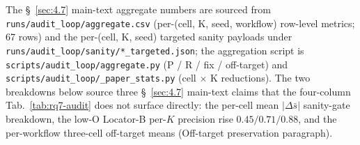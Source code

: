 The \S~\ref{sec:4.7} main-text aggregate numbers are sourced from \texttt{runs/\allowbreak{}audit\_\allowbreak{}loop/\allowbreak{}aggregate.csv} (per-(cell, K, seed, workflow) row-level metrics; 67 rows) and the per-(cell, K, seed) targeted sanity payloads under \texttt{runs/\allowbreak{}audit\_\allowbreak{}loop/\allowbreak{}sanity/\allowbreak{}*\_\allowbreak{}targeted.json}; the aggregation script is \texttt{scripts/\allowbreak{}audit\_\allowbreak{}loop/\allowbreak{}aggregate.py} (P / R / fix / off-target) and \texttt{scripts/\allowbreak{}audit\_\allowbreak{}loop/\allowbreak{}\_\allowbreak{}paper\_\allowbreak{}stats.py} (cell $\times$ K reductions). The two breakdowns below source three \S~\ref{sec:4.7} main-text claims that the four-column Tab.~\ref{tab:rq7-audit} does not surface directly: the per-cell mean $|\Delta\bar{s}|$ sanity-gate breakdown, the low-O Locator-B per-$K$ precision rise $0.45 / 0.71 / 0.88$, and the per-workflow three-cell off-target means (Off-target preservation paragraph).

\begin{table}[t]
\centering
{}
\caption{\S~\ref{sec:4.7} sanity-gate breakdown on the MiniMax-M2.7-highspeed subject, sourced from \texttt{runs/\allowbreak{}audit\_\allowbreak{}loop/\allowbreak{}sanity/\allowbreak{}*\_\allowbreak{}targeted.json}. Per-(cell, $K$) mean and per-cell aggregate of $|\Delta\bar{s}|$ (polluted-vs-clean Mini-IPIP shift on the target dim). Mean over 3 seeds per (cell, $K$); the all-K column averages 9 (K, seed) conditions per cell (one high-N $K{=}10$ seed missing the score\_shift readout is treated as $0$ for the conservative reading reported in \S~\ref{sec:4.7} --- excluding it raises high-N to $1.03$). Sanity threshold = $1.0$.}
\label{tab:rq7-mm-sanity}
\end{table}

